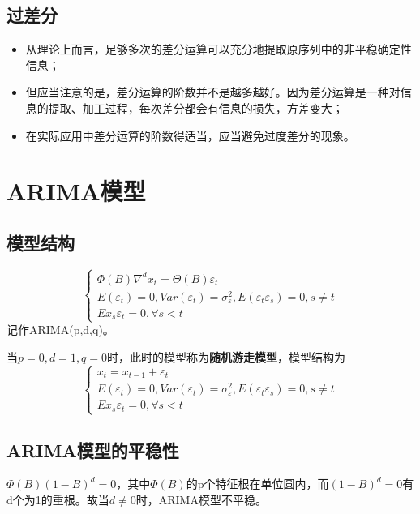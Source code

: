 \documentclass[12pt, a4paper, oneside]{ctexbook}
\begin{document}
\subsection{过差分}
\begin{itemize}
    \item 从理论上而言，足够多次的差分运算可以充分地提取原序列中的非平稳确定性信息；
    \item 但应当注意的是，差分运算的阶数并不是越多越好。因为差分运算是一种对信息的提取、加工过程，每次差分都会有信息的损失，方差变大；
    \item 在实际应用中差分运算的阶数得适当，应当避免过度差分的现象。
\end{itemize}

\section{ARIMA模型}
\subsection{模型结构}
\begin{equation}
    \begin{cases}
        \Phi(B)\nabla^dx_t=\Theta(B)\varepsilon_t                                                          \\
        E(\varepsilon_t)=0,Var(\varepsilon_t)=\sigma_\varepsilon^2,E(\varepsilon_t\varepsilon_s)=0,s\neq t \\
        Ex_s\varepsilon_t=0,\forall s<t
    \end{cases}
\end{equation}
记作ARIMA(p,d,q)。

当$p=0,d=1,q =0$时，此时的模型称为\textbf{随机游走模型}，模型结构为
$$
    \begin{cases}
        x_t=x_{t-1}+\varepsilon_t                                                                          \\
        E(\varepsilon_t)=0,Var(\varepsilon_t)=\sigma_\varepsilon^2,E(\varepsilon_t\varepsilon_s)=0,s\neq t \\
        Ex_s\varepsilon_t=0,\forall s<t
    \end{cases}
$$

\subsection{ARIMA模型的平稳性}
$\Phi(B)(1-B)^d = 0$，其中$\Phi(B)$的p个特征根在单位圆内，而$(1-B)^d = 0$有d个为1的重根。故当$d\neq 0$时，ARIMA模型不平稳。
\end{document}
